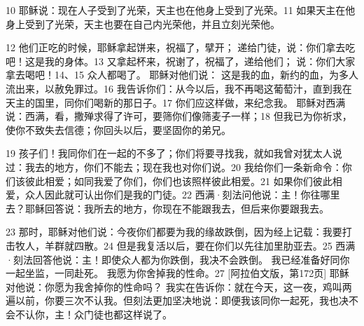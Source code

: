 10  耶稣说：现在人子受到了光荣，天主也在他身上受到了光荣。11  如果天主在他身上受到了光荣，天主也要在自己内光荣他，并且立刻光荣他。\par

12  他们正吃的时候，耶稣拿起饼来，祝福了，擘开； 递给门徒，说：你们拿去吃吧！这是我的身体。13  又拿起杯来，祝谢了，祝福了，递给他们； 说：你们大家拿去喝吧！14、15  众人都喝了。 耶稣对他们说： 这是我的血，新约的血，为多人流出来，以赦免罪过。16  我告诉你们：从今以后，我不再喝这葡萄汁，直到我在天主的国里，同你们喝新的那日子。17  你们应这样做，来纪念我。 耶稣对西满说：西满，看，撒殚求得了许可，要筛你们像筛麦子一样；18  但我已为你祈求，使你不致失去信德；你回头以后，要坚固你的弟兄。\par

19  孩子们！我同你们在一起的不多了；你们将要寻找我，就如我曾对犹太人说过：我去的地方，你们不能去；现在我也对你们说。20  我给你们一条新命令：你们该彼此相爱；如同我爱了你们，你们也该照样彼此相爱。21  如果你们彼此相爱，众人因此就可认出你们是我的门徒。22  西满·刻法问他说：主！你往哪里去？耶稣回答说：我所去的地方，你现在不能跟我去，但后来你要跟我去。\par

23  那时，耶稣对他们说：今夜你们都要为我的缘故跌倒，因为经上记载：我要打击牧人，羊群就四散。24  但是我复活以后，要在你们以先往加里肋亚去。25  西满·刻法回答他说：主！即使众人都为你跌倒，我决不会跌倒。 我已经准备好同你一起坐监，一同赴死。 我愿为你舍掉我的性命。27 [阿拉伯文版，第172页]  耶稣对他说：你愿为我舍掉你的性命吗？ 我实在告诉你：就在今天，这一夜，鸡叫两遍以前，你要三次不认我。但刻法更加坚决地说：即便我该同你一起死，我也决不会不认你，主！众门徒也都这样说了。\par

